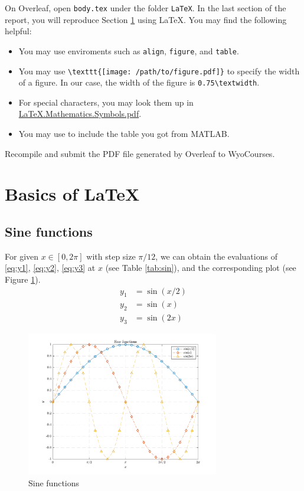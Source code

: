 On Overleaf, open \verb|body.tex| under the folder \verb|LaTeX|. In the last section of the report, you will reproduce Section \ref{sec:bol} using \LaTeX{}. You may find the following helpful:

\begin{itemize}
    \item You may use enviroments such as  \verb|align|, \verb|figure|, and \verb|table|.
    \item You may use \verb|\texttt{[image: /path/to/figure.pdf]}| to specify the width of a figure. In our case, the width of the figure is \verb|0.75\textwidth|.
    \item For special characters, you may look them up in \href{https://libaoj.in/files/LaTeX.Mathematical.Symbols.pdf}{\LaTeX{}.Mathematics.Symbols.pdf}.
    \item You may use \verb|| to include the table you got from MATLAB.
\end{itemize}

Recompile and submit the PDF file generated by Overleaf to WyoCourses.

\newpage
\section{Basics of \LaTeX{}}
\label{sec:bol}
\subsection{Sine functions}
For given $x \in [0, 2\pi]$ with step size $\pi/12$, we can obtain the evaluations of \eqref{eq:y1}, \eqref{eq:y2}, \eqref{eq:y3} at $x$ (see Table \ref{tab:sin}), and the corresponding plot (see Figure \ref{fig:sin}).
\begin{align}
y_1 & = \sin(x/2) \label{eq:y1} \\
y_2 & = \sin(x)   \label{eq:y2} \\
y_3 & = \sin(2x)  \label{eq:y3}
\end{align}

\begin{figure}[!hbtp]
    \centering
    \includegraphics[width=0.75\textwidth]{../Math.3341.Lab.05.ans/lab_05_plot.pdf}
    \caption{Sine functions}
    \label{fig:sin}
\end{figure}
